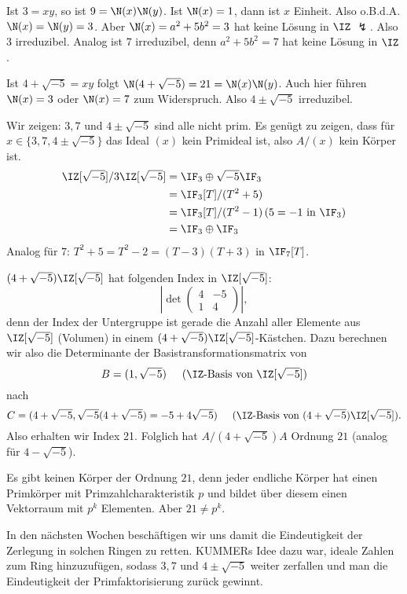 \begin{Beweis}
 Ist $3=xy$, so ist $9=\N(x)\N(y)$. Ist $\N(x)=1$, dann ist $x$ Einheit. Also o.B.d.A. $\N(x)=\N(y)=3$. Aber $\N(x)=a^2+5b^2=3$ hat keine Lösung in $\IZ$ $\lightning$. Also $3$ irreduzibel. Analog ist $7$ irreduzibel, denn $a^2+5b^2=7$ hat keine Lösung in $\IZ$.
 
 Ist $4+\sqrt{-5}=xy$ folgt $\N(4+\sqrt{-5})=21=\N(x)\N(y)$. Auch hier führen $\N(x)=3$ oder $\N(x)=7$ zum Widerspruch. Also $4\pm \sqrt{-5}$ irreduzibel.
 
 Wir zeigen: $3,7$ und $4\pm\sqrt{-5}$ sind alle nicht prim. Es genügt zu zeigen, dass für $x\in\{3,7,4\pm\sqrt{-5}\}$ das Ideal $(x)$ kein Primideal ist, also $A/(x)$ kein Körper ist.
 \begin{align*}
  \IZ[\sqrt{-5}]/3\IZ[\sqrt{-5}] &= \IF_3 \oplus \sqrt{-5}\IF_3\\
  &= \IF_3[T]/(T^2+5)\\
  &= \IF_3[T]/(T^2-1) \,(5=-1 \mbox{ in } \IF_3)\\
  &= \IF_3 \oplus \IF_3
 \end{align*}
Analog für $7$: $T^2+5=T^2-2=(T-3)(T+3)$ in $\IF_7[T]$.

$(4+\sqrt{-5})\IZ[\sqrt{-5}]$ hat folgenden Index in $\IZ[\sqrt{-5}]$:
\[\left| \det \begin{pmatrix}
               4 & -5\\
               1 & 4
              \end{pmatrix}
 \right|, \]
 denn der Index der Untergruppe ist gerade die Anzahl aller Elemente aus $\IZ[\sqrt{-5}]$ (\glqq Volumen\grqq) in einem $(4+\sqrt{-5})\IZ[\sqrt{-5}]$-Kästchen. Dazu berechnen wir also die Determinante der Basistransformationsmatrix von 
 \[B=(1,\sqrt{-5})\hspace{5mm} (\IZ\mbox{-Basis von }\IZ[\sqrt{-5}])\] 
 nach 
 \[C=(4+\sqrt{-5},\sqrt{-5}(4+\sqrt{-5})=-5+4\sqrt{-5})\hspace{5mm} (\IZ\mbox{-Basis von }(4+\sqrt{-5})\IZ[\sqrt{-5}]).\]
 Also erhalten wir Index 21. Folglich hat $A/(4+\sqrt{-5})A$ Ordnung $21$ (analog für $4-\sqrt{-5}$).
 
 Es gibt keinen Körper der Ordnung $21$, denn jeder endliche Körper hat einen Primkörper mit Primzahlcharakteristik $p$ und bildet über diesem einen Vektorraum mit $p^k$ Elementen. Aber $21\neq p^k$. 
\end{Beweis}

\begin{Bemerkung}
In den nächsten Wochen beschäftigen wir uns damit die Eindeutigkeit der Zerlegung in solchen Ringen zu retten. KUMMERs Idee dazu war, ideale Zahlen zum Ring hinzuzufügen, sodass $3,7$ und $4\pm\sqrt{-5}$ weiter zerfallen und man die Eindeutigkeit der Primfaktorisierung zurück gewinnt. 
\end{Bemerkung}